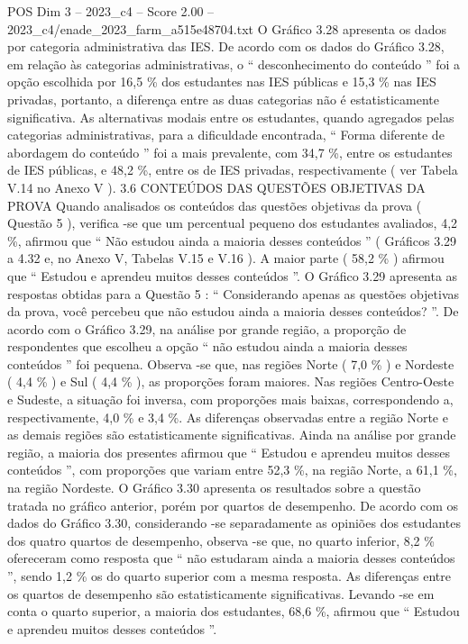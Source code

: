 \begin{textsample}{POS Dim 3 – 2023\_c4 – Score 2.00 – 2023\_c4/enade\_2023\_farm\_a515e48704.txt}
O Gráfico 3.28 apresenta os dados por categoria administrativa das IES.
De acordo com os dados do Gráfico 3.28, em relação às categorias administrativas, o “ desconhecimento do conteúdo ” foi a opção escolhida por 16,5 \% dos estudantes nas IES públicas e 15,3 \% nas IES privadas, portanto, a diferença entre as duas categorias não é estatisticamente significativa.
As alternativas modais entre os estudantes, quando agregados pelas categorias administrativas, para a dificuldade encontrada, “ Forma diferente de abordagem do conteúdo ” foi a mais prevalente, com 34,7 \%, entre os estudantes de IES públicas, e 48,2 \%, entre os de IES privadas, respectivamente ( ver Tabela V.14 no Anexo V ). 3.6 CONTEÚDOS DAS QUESTÕES OBJETIVAS DA PROVA Quando analisados os conteúdos das questões objetivas da prova ( Questão 5 ), verifica -se que um percentual pequeno dos estudantes avaliados, 4,2 \%, afirmou que “ Não estudou ainda a maioria desses conteúdos ” ( Gráficos 3.29 a 4.32 e, no Anexo V, Tabelas V.15 e V.16 ).
A maior parte ( 58,2 \% ) afirmou que “ Estudou e aprendeu muitos desses conteúdos ”.
O Gráfico 3.29 apresenta as respostas obtidas para a Questão 5 : “ Considerando apenas as questões objetivas da prova, você percebeu que não estudou ainda a maioria desses conteúdos? ”.
De acordo com o Gráfico 3.29, na análise por grande região, a proporção de respondentes que escolheu a opção “ não estudou ainda a maioria desses conteúdos ” foi pequena.
Observa -se que, nas regiões Norte ( 7,0 \% ) e Nordeste ( 4,4 \% ) e Sul ( 4,4 \% ), as proporções foram maiores.
Nas regiões Centro-Oeste e Sudeste, a situação foi inversa, com proporções mais baixas, correspondendo a, respectivamente, 4,0 \% e 3,4 \%.
As diferenças observadas entre a região Norte e as demais regiões são estatisticamente significativas.
Ainda na análise por grande região, a maioria dos presentes afirmou que “ Estudou e aprendeu muitos desses conteúdos ”, com proporções que variam entre 52,3 \%, na região Norte, a 61,1 \%, na região Nordeste.
O Gráfico 3.30 apresenta os resultados sobre a questão tratada no gráfico anterior, porém por quartos de desempenho.
De acordo com os dados do Gráfico 3.30, considerando -se separadamente as opiniões dos estudantes dos quatro quartos de desempenho, observa -se que, no quarto inferior, 8,2 \% ofereceram como resposta que “ não estudaram ainda a maioria desses conteúdos ”, sendo 1,2 \% os do quarto superior com a mesma resposta.
As diferenças entre os quartos de desempenho são estatisticamente significativas.
Levando -se em conta o quarto superior, a maioria dos estudantes, 68,6 \%, afirmou que “ Estudou e aprendeu muitos desses conteúdos ”.

\end{textsample}
